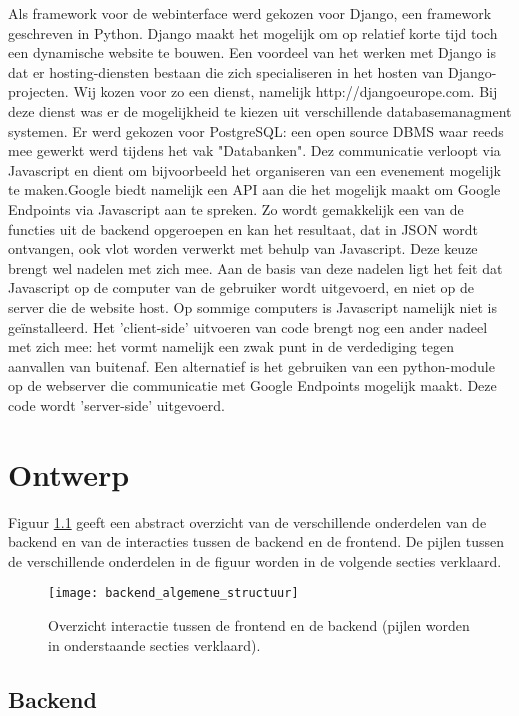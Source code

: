 Als framework voor de webinterface werd gekozen voor Django, een framework geschreven in Python. Django maakt het mogelijk om op relatief korte tijd toch een dynamische website te bouwen.
Een voordeel van het werken met Django is dat er hosting-diensten bestaan die zich specialiseren in het hosten van Django-projecten. Wij kozen voor zo een dienst, namelijk http://djangoeurope.com.
Bij deze dienst was er de mogelijkheid te kiezen uit verschillende databasemanagment systemen. Er werd gekozen voor PostgreSQL: een open source DBMS waar reeds mee gewerkt werd tijdens het vak "Databanken".
Dez communicatie verloopt via Javascript en dient om bijvoorbeeld het organiseren van een evenement mogelijk te maken.Google biedt namelijk een API aan die het mogelijk maakt om Google Endpoints via Javascript aan te spreken. Zo wordt gemakkelijk een van de functies uit de backend opgeroepen en kan het resultaat, dat in JSON wordt ontvangen, ook vlot worden verwerkt met behulp van Javascript. Deze keuze brengt wel nadelen met zich mee. Aan de basis van deze nadelen ligt het feit dat Javascript op de computer van de gebruiker wordt uitgevoerd, en niet op de server die de website host. Op sommige computers is Javascript namelijk niet is geïnstalleerd. Het 'client-side' uitvoeren van code brengt nog een ander nadeel met zich mee: het vormt namelijk een zwak punt in de verdediging tegen aanvallen van buitenaf. Een alternatief is het gebruiken van een python-module op de webserver die communicatie met Google Endpoints mogelijk maakt. Deze code wordt 'server-side' uitgevoerd.


\chapter{Ontwerp}
Figuur \ref{fig:algemene structuur backend} geeft een abstract overzicht van de verschillende onderdelen van de backend en van de interacties tussen de backend en de frontend. De pijlen tussen de verschillende onderdelen in de figuur worden in de volgende secties verklaard.

\begin{figure}[H]
	\centering
	\texttt{[image: backend\_algemene\_structuur]}
	\caption{Overzicht interactie tussen de frontend en de backend (pijlen worden in onderstaande secties verklaard).}
	\label{fig:algemene structuur backend}
	
\end{figure}
\section{Backend}
